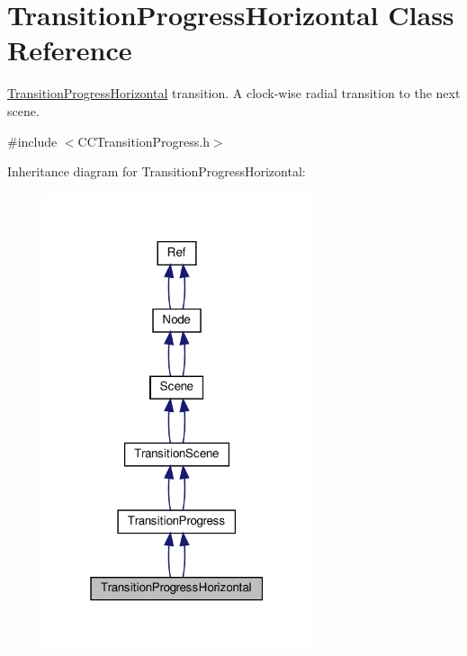 \hypertarget{classTransitionProgressHorizontal}{}\section{Transition\+Progress\+Horizontal Class Reference}
\label{classTransitionProgressHorizontal}


\hyperlink{classTransitionProgressHorizontal}{Transition\+Progress\+Horizontal} transition. A clock-\/wise radial transition to the next scene.  




{\ttfamily \#include $<$C\+C\+Transition\+Progress.\+h$>$}



Inheritance diagram for Transition\+Progress\+Horizontal\+:
\nopagebreak
\begin{figure}[H]
\begin{center}
\leavevmode
\includegraphics[width=223pt]{classTransitionProgressHorizontal__inherit__graph}
\end{center}
\end{figure}


